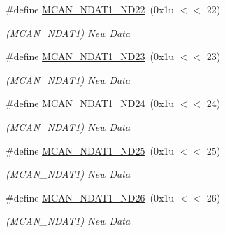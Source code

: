 \begin{DoxyCompactItemize}
\mbox{\label{group__SAMV71__MCAN_ga5bc7a4a898dc76a86577dd16c397fdfa}} 
\#define \mbox{\hyperlink{group__SAMV71__MCAN_ga5bc7a4a898dc76a86577dd16c397fdfa}{M\+C\+A\+N\+\_\+\+N\+D\+A\+T1\+\_\+\+N\+D22}}~(0x1u $<$$<$ 22)
\begin{DoxyCompactList}\small\item\em (M\+C\+A\+N\+\_\+\+N\+D\+A\+T1) New Data \end{DoxyCompactList}\item 
\mbox{\label{group__SAMV71__MCAN_ga08e4808a58e5dbd6e79f271de92adc89}} 
\#define \mbox{\hyperlink{group__SAMV71__MCAN_ga08e4808a58e5dbd6e79f271de92adc89}{M\+C\+A\+N\+\_\+\+N\+D\+A\+T1\+\_\+\+N\+D23}}~(0x1u $<$$<$ 23)
\begin{DoxyCompactList}\small\item\em (M\+C\+A\+N\+\_\+\+N\+D\+A\+T1) New Data \end{DoxyCompactList}\item 
\mbox{\label{group__SAMV71__MCAN_ga7b36ec061d191edb07ed4654872532cd}} 
\#define \mbox{\hyperlink{group__SAMV71__MCAN_ga7b36ec061d191edb07ed4654872532cd}{M\+C\+A\+N\+\_\+\+N\+D\+A\+T1\+\_\+\+N\+D24}}~(0x1u $<$$<$ 24)
\begin{DoxyCompactList}\small\item\em (M\+C\+A\+N\+\_\+\+N\+D\+A\+T1) New Data \end{DoxyCompactList}\item 
\mbox{\label{group__SAMV71__MCAN_ga3810a8438a52f07fa5e642818148b221}} 
\#define \mbox{\hyperlink{group__SAMV71__MCAN_ga3810a8438a52f07fa5e642818148b221}{M\+C\+A\+N\+\_\+\+N\+D\+A\+T1\+\_\+\+N\+D25}}~(0x1u $<$$<$ 25)
\begin{DoxyCompactList}\small\item\em (M\+C\+A\+N\+\_\+\+N\+D\+A\+T1) New Data \end{DoxyCompactList}\item 
\mbox{\label{group__SAMV71__MCAN_gab9832d637addae2b7cb05f6603895423}} 
\#define \mbox{\hyperlink{group__SAMV71__MCAN_gab9832d637addae2b7cb05f6603895423}{M\+C\+A\+N\+\_\+\+N\+D\+A\+T1\+\_\+\+N\+D26}}~(0x1u $<$$<$ 26)
\begin{DoxyCompactList}\small\item\em (M\+C\+A\+N\+\_\+\+N\+D\+A\+T1) New Data \end{DoxyCompactList}\item 
$$
\end{DoxyCompactItemize}
